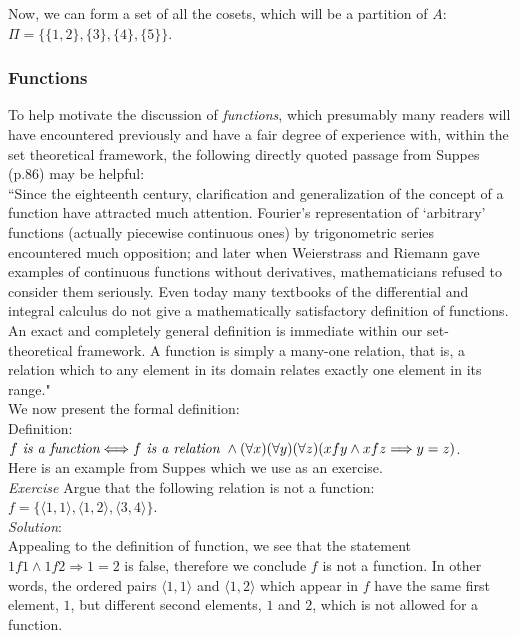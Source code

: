 Now, we can form a set of all the cosets, which will be a partition of $A$:\\
$\Pi=\{\{1,2\},\{3\},\{4\},\{5\}\}$.

\subsubsection{Functions}

To help motivate the discussion of \textit{functions}, which presumably many readers will have encountered previously and have a fair degree of experience with, within the set theoretical framework, the following directly quoted passage from Suppes (p.86) may be helpful:\\

``Since the eighteenth century, clarification and generalization of the concept of a function have attracted much attention.  Fourier's representation of `arbitrary' functions (actually piecewise continuous ones) by trigonometric series encountered much opposition; and later when Weierstrass and Riemann gave examples of continuous functions without derivatives, mathematicians refused to consider them seriously.  Even today many textbooks of the differential and integral calculus do not give a mathematically satisfactory definition of functions.  An exact and completely general definition is immediate within our set-theoretical framework.  A function is simply a many-one relation, that is, a relation which to any element in its domain relates exactly one element in its range."\\

We now present the formal definition:\\

Definition: $f \textit{ is a function}\index{function} \Longleftrightarrow f \textit{ is a relation } \land (\forall x)(\forall y)(\forall z)(x f y \land x f z \Longrightarrow y = z)$.\\

Here is an example from Suppes which we use as an exercise.\\

\textit{Exercise} Argue that the following relation is not a function: $f=\{\langle 1,1\rangle, \langle 1,2 \rangle, \langle 3,4 \rangle\}$.\\

\textit{Solution}:\\
Appealing to the definition of function, we see that the statement $1f1 \land 1f2 \Longrightarrow 1=2$ is false, therefore we conclude $f$ is not a function.  In other words, the ordered pairs $\langle 1, 1 \rangle$ and $\langle 1, 2\rangle$ which appear in $f$ have the same first element, $1$, but different second elements, $1$ and $2$, which is not allowed for a function.\\

